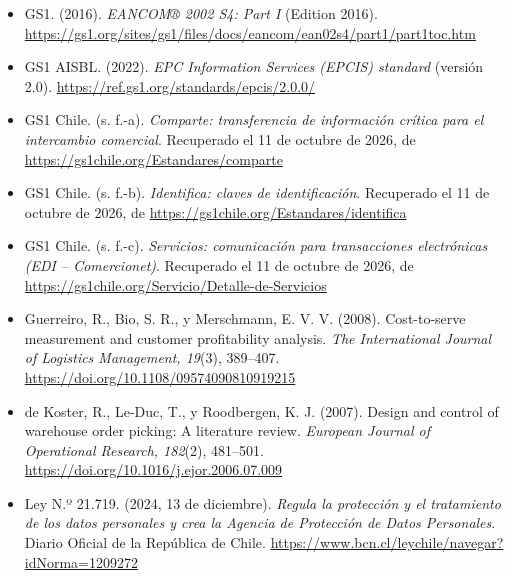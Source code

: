 \documentclass[carta,firma]{lafrox}
\begin{document}
\begin{itemize}[itemsep=1pt]
\item \begin{samepage}
GS1. (2016). \emph{EANCOM® 2002 S4: Part I} (Edition 2016). \url{https://gs1.org/sites/gs1/files/docs/eancom/ean02s4/part1/part1toc.htm}
\end{samepage}
\item \begin{samepage}
GS1 AISBL. (2022). \emph{EPC Information Services (EPCIS) standard} (versión 2.0). \url{https://ref.gs1.org/standards/epcis/2.0.0/}
\end{samepage}
\item \begin{samepage}
GS1 Chile. (s. f.-a). \emph{Comparte: transferencia de información crítica para el intercambio comercial}. Recuperado el 11 de octubre de 2026, de \url{https://gs1chile.org/Estandares/comparte}
\end{samepage}
\item \begin{samepage}
GS1 Chile. (s. f.-b). \emph{Identifica: claves de identificación}. Recuperado el 11 de octubre de 2026, de \url{https://gs1chile.org/Estandares/identifica}
\end{samepage}
\item \begin{samepage}
GS1 Chile. (s. f.-c). \emph{Servicios: comunicación para transacciones electrónicas (EDI – Comercionet)}. Recuperado el 11 de octubre de 2026, de \url{https://gs1chile.org/Servicio/Detalle-de-Servicios}
\end{samepage}
\item \begin{samepage}
Guerreiro, R., Bio, S. R., y Merschmann, E. V. V. (2008). Cost-to-serve measurement and customer profitability analysis. \emph{The International Journal of Logistics Management, 19}(3), 389–407. \url{https://doi.org/10.1108/09574090810919215}
\end{samepage}
\item \begin{samepage}
de Koster, R., Le-Duc, T., y Roodbergen, K. J. (2007). Design and control of warehouse order picking: A literature review. \emph{European Journal of Operational Research, 182}(2), 481–501. \url{https://doi.org/10.1016/j.ejor.2006.07.009}
\end{samepage}
\item \begin{samepage}
Ley N.º 21.719. (2024, 13 de diciembre). \emph{Regula la protección y el tratamiento de los datos personales y crea la Agencia de Protección de Datos Personales}. Diario Oficial de la República de Chile. \url{https://www.bcn.cl/leychile/navegar?idNorma=1209272}

\end{samepage}
\end{itemize}
\end{document}
